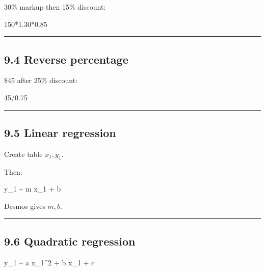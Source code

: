 \documentclass[
]{article}
\newenvironment{Shaded}{}{}
\newcommand{\NormalTok}[1]{#1}
\begin{document}
30\% markup then 15\% discount:

\begin{Shaded}
\begin{Highlighting}[]
\NormalTok{150*1.30*0.85}
\end{Highlighting}
\end{Shaded}

\begin{center}\rule{0.5\linewidth}{0.5pt}\end{center}

\subsection{9.4 Reverse percentage}\label{reverse-percentage-1}

\$45 after 25\% discount:

\begin{Shaded}
\begin{Highlighting}[]
\NormalTok{45/0.75}
\end{Highlighting}
\end{Shaded}

\begin{center}\rule{0.5\linewidth}{0.5pt}\end{center}

\subsection{9.5 Linear regression}\label{linear-regression}

Create table \(x_1,y_1\).

Then:

\begin{Shaded}
\begin{Highlighting}[]
\NormalTok{y\_1 \textasciitilde{} m x\_1 + b}
\end{Highlighting}
\end{Shaded}

Desmos gives \(m,b\).

\begin{center}\rule{0.5\linewidth}{0.5pt}\end{center}

\subsection{9.6 Quadratic regression}\label{quadratic-regression}

\begin{Shaded}
\begin{Highlighting}[]
\NormalTok{y\_1 \textasciitilde{} a x\_1\^{}2 + b x\_1 + c}
\end{Highlighting}
\end{Shaded}
\end{document}

